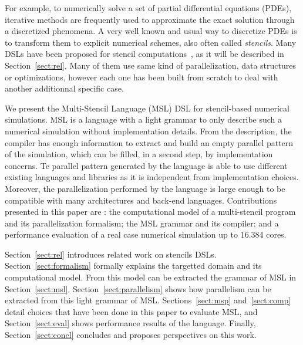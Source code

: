 For example, to numerically solve a set of partial differential equations (PDEs), iterative methods are frequently used to approximate the exact solution through a discretized phenomena. A very well known and usual way to discretize PDEs is to transform them to explicit numerical schemes, also often called \emph{stencils}. Many DSLs have been proposed for stencil computations~\cite{spaaTangCKLL11,citeulike12258902,Ragan-Kelley:2013:HLC:2491956.2462176,DeVito:2011:LDS:2063384.2063396,Camier:2015:IPP:2820083.2820107}, as it will be described in Section~\ref{sect:rel}. Many of them use same kind of parallelization, data structures or optimizations, however each one has been built from scratch to deal with another additionnal specific case.

We present the Multi-Stencil Language (MSL) DSL for stencil-based numerical simulations. MSL is a language with a light grammar to only describe such a numerical simulation without implementation details. From the description, the compiler has enough information to extract and build an empty parallel pattern of the simulation, which can be filled, in a second step, by implementation concerns. Te parallel pattern generated by the language is able to use different existing languages and libraries as it is independent from implementation choices. Moreover, the parallelization performed by the language is large enough to be compatible with many architectures and back-end languages. Contributions presented in this paper are : the computational model of a multi-stencil program and its parallelization formalism; the MSL grammar and its compiler; and a performance evaluation of a real case numerical simulation up to 16.384 cores.

Section~\ref{sect:rel} introduces related work on stencils DSLs. Section~\ref{sect:formalism} formally explains the targetted domain and its computational model. From this model can be extracted the grammar of MSL in Section~\ref{sect:msl}. Section~\ref{sect:parallelism} shows how parallelism can be extracted from this light grammar of MSL. Sections~\ref{sect:msp} and~\ref{sect:comp} detail choices that have been done in this paper to evaluate MSL, and Section~\ref{sect:eval} shows performance results of the language. Finally, Section~\ref{sect:concl} concludes and proposes perspectives on this work.